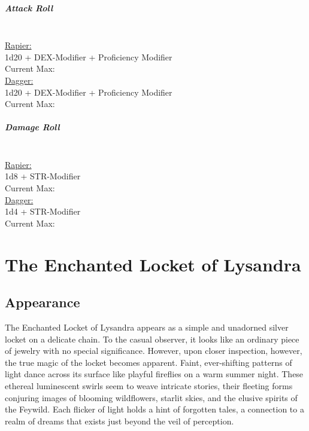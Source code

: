 \documentclass[letterpaper,openany,oneside,twocolumn]{book}
\begin{document}
\paragraph*{Attack Roll}\hfill\\
\underline{Rapier:}\\
1d20 + DEX-Modifier + Proficiency Modifier\\
\indent Current Max: \\
\underline{Dagger:}\\
1d20 + DEX-Modifier + Proficiency Modifier\\
\indent Current Max: 
\paragraph*{Damage Roll}\hfill\\
\underline{Rapier:}\\
1d8 + STR-Modifier\\
\indent Current Max: \\
\underline{Dagger:}\\
1d4 + STR-Modifier\\
\indent Current Max: 

\chapter*{The Enchanted Locket of Lysandra}
\vspace*{10cm}
\section*{Appearance}
The Enchanted Locket of Lysandra appears as a simple and unadorned silver locket on a delicate chain. To the casual observer, it looks like an ordinary piece of jewelry with no special significance. However, upon closer inspection, however, the true magic of the locket becomes apparent. Faint, ever-shifting patterns of light dance across its surface like playful fireflies on a warm summer night. These ethereal luminescent swirls seem to weave intricate stories, their fleeting forms conjuring images of blooming wildflowers, starlit skies, and the elusive spirits of the Feywild. Each flicker of light holds a hint of forgotten tales, a connection to a realm of dreams that exists just beyond the veil of perception.
\end{document}
